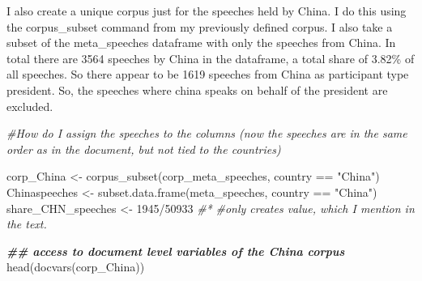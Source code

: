 \documentclass[
]{article}
\newenvironment{Shaded}{\begin{snugshade}}{\end{snugshade}}
\newcommand{\CommentTok}[1]{\textcolor[rgb]{0.56,0.35,0.01}{\textit{#1}}}
\newcommand{\DecValTok}[1]{\textcolor[rgb]{0.00,0.00,0.81}{#1}}
\newcommand{\DocumentationTok}[1]{\textcolor[rgb]{0.56,0.35,0.01}{\textbf{\textit{#1}}}}
\newcommand{\FunctionTok}[1]{\textcolor[rgb]{0.00,0.00,0.00}{#1}}
\newcommand{\NormalTok}[1]{#1}
\newcommand{\OtherTok}[1]{\textcolor[rgb]{0.56,0.35,0.01}{#1}}
\newcommand{\SpecialCharTok}[1]{\textcolor[rgb]{0.00,0.00,0.00}{#1}}
\newcommand{\StringTok}[1]{\textcolor[rgb]{0.31,0.60,0.02}{#1}}
\begin{document}
I also create a unique corpus just for the speeches held by China. I do
this using the corpus\_subset command from my previously defined corpus.
I also take a subset of the meta\_speeches dataframe with only the
speeches from China. In total there are 3564 speeches by China in the
dataframe, a total share of 3.82\% of all speeches. So there appear to
be 1619 speeches from China as participant type president. So, the
speeches where china speaks on behalf of the president are excluded.

\begin{Shaded}
\begin{Highlighting}[]
\CommentTok{\#How do I assign the speeches to the columns (now the speeches are in the same order as in the document, but not tied to the countries)}

\NormalTok{corp\_China }\OtherTok{\textless{}{-}} \FunctionTok{corpus\_subset}\NormalTok{(corp\_meta\_speeches, country }\SpecialCharTok{==} \StringTok{"China"}\NormalTok{)}
\NormalTok{Chinaspeeches }\OtherTok{\textless{}{-}} \FunctionTok{subset.data.frame}\NormalTok{(meta\_speeches, country }\SpecialCharTok{==} \StringTok{"China"}\NormalTok{)}
\NormalTok{share\_CHN\_speeches }\OtherTok{\textless{}{-}} \DecValTok{1945}\SpecialCharTok{/}\DecValTok{50933}
\CommentTok{\#*}
\CommentTok{\#only creates value, which I mention in the text.}

\DocumentationTok{\#\# access to document level variables of the China corpus}
\FunctionTok{head}\NormalTok{(}\FunctionTok{docvars}\NormalTok{(corp\_China))}
\end{Highlighting}
\end{Shaded}
\end{document}

